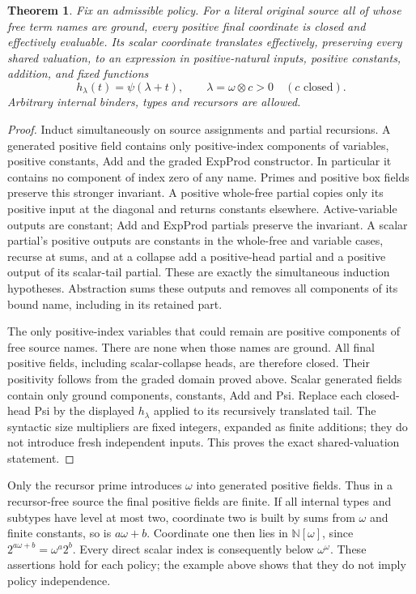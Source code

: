 \documentclass[11pt]{article}
\newtheorem{theorem}{Theorem}[section]
\newcommand{\N}{\mathbb N}
\begin{document}
\begin{theorem}\label{thm:translation}
Fix an admissible policy. For a literal original source all of whose free
term names are ground, every positive final coordinate is closed and
effectively evaluable. Its scalar coordinate translates effectively,
preserving every shared valuation, to an expression in positive-natural
inputs, positive constants, addition, and fixed functions
\[
 h_\lambda(t)=\psi(\lambda+t),\qquad
 \lambda=\omega\otimes c>0\quad(c\text{ closed}).
\]
Arbitrary internal binders, types and recursors are allowed.
\end{theorem}
\begin{proof}
Induct simultaneously on source assignments and partial recursions.
A generated positive field contains only positive-index components of
variables, positive constants, Add and the graded ExpProd constructor.
In particular it contains no component of index zero of any name.
Primes and positive box fields preserve this stronger invariant.
A positive whole-free partial copies only its positive input at the
diagonal and returns constants elsewhere. Active-variable outputs are
constant; Add and ExpProd partials preserve the invariant. A scalar
partial's positive outputs are constants in the whole-free and variable
cases, recurse at sums, and at a collapse add a positive-head partial
and a positive output of its scalar-tail partial. These are exactly the
simultaneous induction hypotheses. Abstraction sums these outputs and
removes all components of its bound name, including in its retained part.

The only positive-index variables that could remain are positive
components of free source names. There are none when those names are
ground. All final positive fields, including scalar-collapse heads,
are therefore closed. Their positivity follows from the graded domain
proved above. Scalar generated fields contain only ground components,
constants, Add and Psi. Replace each closed-head Psi by the displayed
$h_\lambda$ applied to its recursively translated tail. The syntactic
size multipliers are fixed integers, expanded as finite additions; they
do not introduce fresh independent inputs. This proves the exact
shared-valuation statement.
\end{proof}

Only the recursor prime introduces $\omega$ into generated positive
fields. Thus in a recursor-free source the final positive fields are
finite. If all internal types and subtypes have level at most two,
coordinate two is built by sums from $\omega$ and finite constants,
so is $a\omega+b$. Coordinate one then lies in $\N[\omega]$, since
$2^{a\omega+b}=\omega^a2^b$. Every direct scalar index is consequently
below $\omega^\omega$. These assertions hold for each policy; the
example above shows that they do not imply policy independence.
\end{document}
